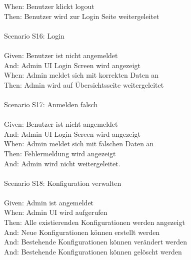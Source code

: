 \begin{tabbing}
    When: \> \> \>   Benutzer klickt logout\\
    Then: \> \> \>  Benutzer wird zur Login Seite weitergeleitet\\
    \\
    Scenario S16: \> \> \>  Login\\ \\
    Given: \> \> \>  Benutzer ist nicht angemeldet\\
    And: \> \> \>    Admin UI Login Screen wird angezeigt\\
    When: \> \> \>   Admin meldet sich mit korrekten Daten an\\
    Then: \> \> \>   Admin wird auf Übersichtsseite weitergeleitet\\
    \\
    Scenario S17: \> \> \>  Anmelden falsch\\ \\
    Given: \> \> \>  Benutzer ist nicht angemeldet\\
    And: \> \> \>    Admin UI Login Screen wird angezeigt\\
    When: \> \> \>   Admin meldet sich mit falschen Daten an\\
    Then: \> \> \>   Fehlermeldung wird angezeigt\\
    And: \> \> \>   Admin wird nicht weitergeleitet.\\
    \\
    Scenario S18: \> \> \>  Konfiguration verwalten \\ \\
    Given: \> \> \>  Admin ist angemeldet\\
    When: \> \> \>  Admin UI wird aufgerufen\\
    Then: \> \> \>  Alle existierenden Konfigurationen werden angezeigt\\
    And: \> \> \>  Neue Konfigurationen können erstellt werden\\
    And: \> \> \>  Bestehende Konfigurationen können verändert werden\\
    And: \> \> \>  Bestehende Konfigurationen können gelöscht werden\\
\end{tabbing}

